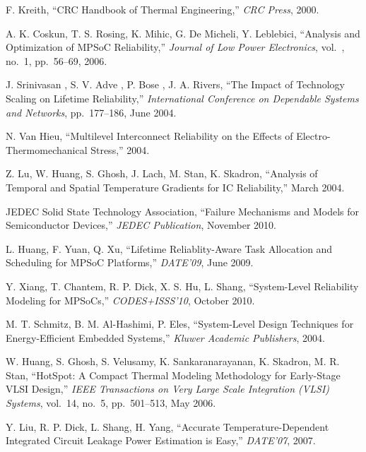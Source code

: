 \begin{thebibliography}{99}
    F. Kreith,
    ``CRC Handbook of Thermal Engineering,''
    \emph{CRC Press},
    2000.

    A. K. Coskun, T. S. Rosing, K. Mihic, G. De Micheli, Y. Leblebici,
    ``Analysis and Optimization of MPSoC Reliability,''
    \emph{Journal of Low Power Electronics},
    vol.~, no.~1, pp.~56--69, 2006.

    J. Srinivasan , S. V. Adve , P. Bose , J. A. Rivers,
    ``The Impact of Technology Scaling on Lifetime Reliability,''
    \emph{International Conference on Dependable Systems and Networks},
    pp.~177--186, June 2004.

    N. Van Hieu,
    ``Multilevel Interconnect Reliability on the Effects of Electro-Thermomechanical Stress,''
    2004.

    Z. Lu, W. Huang, S. Ghosh, J. Lach, M. Stan, K. Skadron,
    ``Analysis of Temporal and Spatial Temperature Gradients for IC Reliability,''
    March 2004.

    JEDEC Solid State Technology Association,
    ``Failure Mechanisms and Models for Semiconductor Devices,''
    \emph{JEDEC Publication},
    November 2010.

    L. Huang, F. Yuan, Q. Xu,
    ``Lifetime Reliablity-Aware Task Allocation and Scheduling for MPSoC Platforms,''
    \emph{DATE'09},
    June 2009.

    Y. Xiang, T. Chantem, R. P. Dick, X. S. Hu, L. Shang,
    ``System-Level Reliability Modeling for MPSoCs,''
    \emph{CODES+ISSS'10},
    October 2010.

    M. T. Schmitz, B. M. Al-Hashimi, P. Eles,
    ``System-Level Design Techniques for Energy-Efficient Embedded Systems,''
    \emph{Kluwer Academic Publishers},
    2004.

    W. Huang, S. Ghosh, S. Velusamy, K. Sankaranarayanan, K. Skadron, M. R. Stan,
    ``HotSpot: A Compact Thermal Modeling Methodology for Early-Stage VLSI Design,''
    \emph{IEEE Transactions on Very Large Scale Integration (VLSI) Systems},
    vol.~14, no.~5, pp.~501--513, May 2006.

    Y. Liu, R. P. Dick, L. Shang, H. Yang,
    ``Accurate Temperature-Dependent Integrated Circuit Leakage Power Estimation is Easy,''
    \emph{DATE'07},
    2007.


\end{thebibliography}
